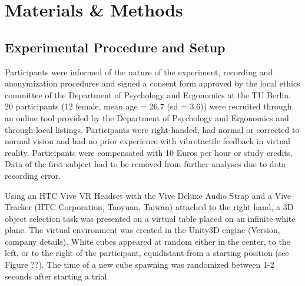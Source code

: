 \section{Materials \& Methods}
\subsection{Experimental Procedure and Setup}
Participants were informed of the nature of the experiment, recording and anonymization procedures and signed a consent form approved by the local ethics committee of the Department of Psychology and Ergonomics at the TU Berlin. 20 participants (12 female, mean age = 26.7 (sd = 3.6)) were recruited through an online tool provided by the Department of Psychology and Ergonomics and through local listings. Participants were right-handed, had normal or corrected to normal vision and had no prior experience with vibrotactile feedback in virtual reality. Participants were compensated with 10 Euros per hour or study credits. Data of the first subject had to be removed from further analyses due to data recording error.

Using an HTC Vive VR Headset with the Vive Deluxe Audio Strap and a Vive Tracker (HTC Corporation, Taoyuan, Taiwan) attached to the right hand, a 3D object selection task was presented on a virtual table placed on an infinite white plane. The virtual environment was created in the Unity3D engine (Version, company details). White cubes appeared at random either in the center, to the left, or to the right of the participant, equidistant from a starting position (see Figure ??). The time of a new cube spawning was randomized between 1-2 seconds after starting a trial. 

